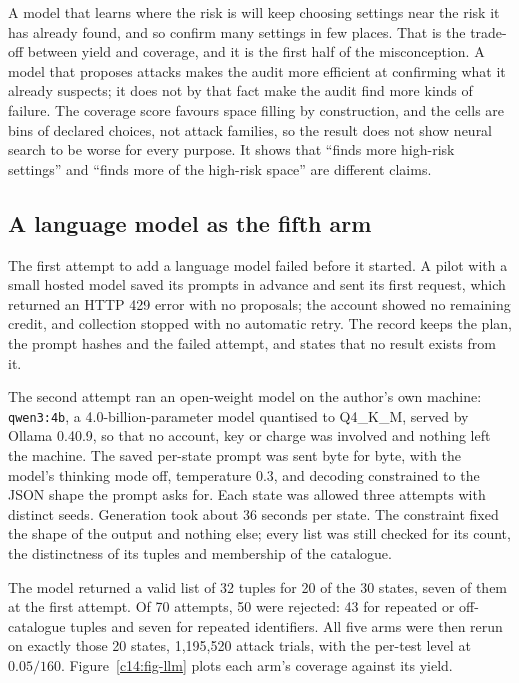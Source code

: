 A model that learns where the risk is will keep choosing settings near the risk it has
already found, and so confirm many settings in few places. That is the trade-off between
yield and coverage, and it is the first half of the misconception. A model that
proposes attacks makes the audit more efficient at confirming what it already
suspects; it does not by that fact make the audit find more kinds of failure. The
coverage score favours space filling by construction, and the cells are bins of
declared choices, not attack families, so the result does not show neural search to be
worse for every purpose. It shows that ``finds more high-risk settings'' and ``finds
more of the high-risk space'' are different claims.

\subsection{A language model as the fifth arm}\label{c14:sec-llm}

The first attempt to add a language model failed before it started. A pilot with a
small hosted model saved its prompts in advance and sent its first request, which
returned an HTTP 429 error with no proposals; the account showed no remaining credit,
and collection stopped with no automatic retry. The record keeps the plan, the prompt
hashes and the failed attempt, and states that no result exists from it.

The second attempt ran an open-weight model on the author's own machine:
\texttt{qwen3:4b}, a 4.0-billion-parameter model quantised to Q4\_K\_M, served by
Ollama 0.40.9, so that no account, key or charge was involved and nothing left the
machine. The saved per-state prompt was sent byte for byte, with the model's
thinking mode off, temperature 0.3, and decoding constrained to the JSON shape the
prompt asks for. Each state was allowed three attempts with distinct seeds. Generation
took about 36 seconds per state.
The constraint fixed the shape of the output and nothing else; every list was still
checked for its count, the distinctness of its tuples and membership of the catalogue.

The model returned a valid list of 32 tuples for 20 of the 30 states, seven of them at
the first attempt. Of 70 attempts, 50 were rejected: 43 for repeated or off-catalogue
tuples and seven for repeated identifiers.
All five arms were then rerun on exactly those 20 states, 1{,}195{,}520 attack trials,
with the per-test level at $0.05/160$. Figure~\ref{c14:fig-llm} plots each arm's
coverage against its yield.

